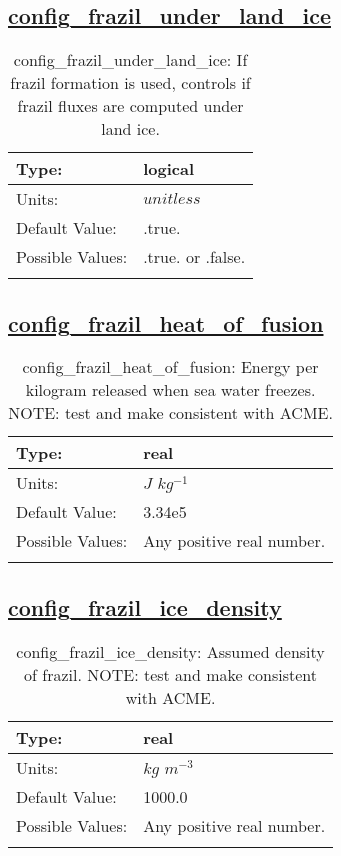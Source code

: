 \subsection[config\_frazil\_under\_land\_ice]{\hyperref[sec:nm_tab_frazil_ice]{config\_frazil\_under\_land\_ice}}
\label{subsec:nm_sec_config_frazil_under_land_ice}
\begin{center}
\begin{longtable}{| p{2.0in} || p{4.0in} |}
    \hline
    Type: & logical \\
    \hline
    Units: & $unitless$ \\
    \hline
    Default Value: & .true. \\
    \hline
    Possible Values: & .true. or .false. \\
    \hline
    \caption{config\_frazil\_under\_land\_ice: If frazil formation is used, controls if frazil fluxes are computed under land ice.}
\end{longtable}
\end{center}
\subsection[config\_frazil\_heat\_of\_fusion]{\hyperref[sec:nm_tab_frazil_ice]{config\_frazil\_heat\_of\_fusion}}
\label{subsec:nm_sec_config_frazil_heat_of_fusion}
\begin{center}
\begin{longtable}{| p{2.0in} || p{4.0in} |}
    \hline
    Type: & real \\
    \hline
    Units: & $J$ $kg^{-1}$ \\
    \hline
    Default Value: & 3.34e5 \\
    \hline
    Possible Values: & Any positive real number. \\
    \hline
    \caption{config\_frazil\_heat\_of\_fusion: Energy per kilogram released when sea water freezes. NOTE: test and make consistent with ACME.}
\end{longtable}
\end{center}
\subsection[config\_frazil\_ice\_density]{\hyperref[sec:nm_tab_frazil_ice]{config\_frazil\_ice\_density}}
\label{subsec:nm_sec_config_frazil_ice_density}
\begin{center}
\begin{longtable}{| p{2.0in} || p{4.0in} |}
    \hline
    Type: & real \\
    \hline
    Units: & $kg$ $m^{-3}$ \\
    \hline
    Default Value: & 1000.0 \\
    \hline
    Possible Values: & Any positive real number. \\
    \hline
    \caption{config\_frazil\_ice\_density: Assumed density of frazil. NOTE: test and make consistent with ACME.}
\end{longtable}
\end{center}
